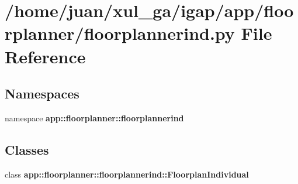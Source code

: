 \section{/home/juan/xul\_\-ga/igap/app/floorplanner/floorplannerind.py File Reference}
\label{floorplannerind_8py}
\subsection*{Namespaces}
\begin{CompactItemize}
\item 
namespace {\bf app::floorplanner::floorplannerind}
\end{CompactItemize}
\subsection*{Classes}
\begin{CompactItemize}
\item 
class {\bf app::floorplanner::floorplannerind::FloorplanIndividual}
\end{CompactItemize}
